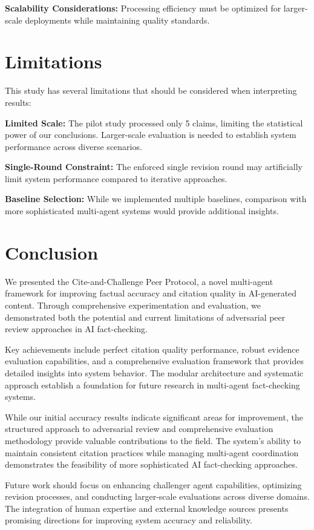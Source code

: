 \documentclass[11pt,a4paper]{article}
\begin{document}
\textbf{Scalability Considerations:} Processing efficiency must be optimized for larger-scale deployments while maintaining quality standards.

\section{Limitations}

This study has several limitations that should be considered when interpreting results:

\textbf{Limited Scale:} The pilot study processed only 5 claims, limiting the statistical power of our conclusions. Larger-scale evaluation is needed to establish system performance across diverse scenarios.

\textbf{Single-Round Constraint:} The enforced single revision round may artificially limit system performance compared to iterative approaches.

\textbf{Baseline Selection:} While we implemented multiple baselines, comparison with more sophisticated multi-agent systems would provide additional insights.

\section{Conclusion}

We presented the Cite-and-Challenge Peer Protocol, a novel multi-agent framework for improving factual accuracy and citation quality in AI-generated content. Through comprehensive experimentation and evaluation, we demonstrated both the potential and current limitations of adversarial peer review approaches in AI fact-checking.

Key achievements include perfect citation quality performance, robust evidence evaluation capabilities, and a comprehensive evaluation framework that provides detailed insights into system behavior. The modular architecture and systematic approach establish a foundation for future research in multi-agent fact-checking systems.

While our initial accuracy results indicate significant areas for improvement, the structured approach to adversarial review and comprehensive evaluation methodology provide valuable contributions to the field. The system's ability to maintain consistent citation practices while managing multi-agent coordination demonstrates the feasibility of more sophisticated AI fact-checking approaches.

Future work should focus on enhancing challenger agent capabilities, optimizing revision processes, and conducting larger-scale evaluations across diverse domains. The integration of human expertise and external knowledge sources presents promising directions for improving system accuracy and reliability.
\end{document}
